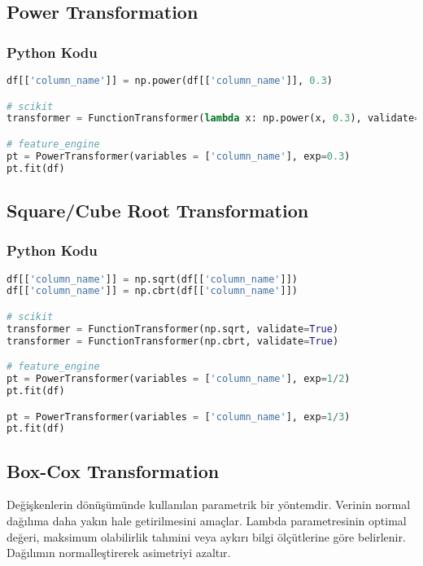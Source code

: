 \subsection{Power Transformation}

\subsubsection{Python Kodu}

\begin{lstlisting}[language=Python]
df[['column_name']] = np.power(df[['column_name']], 0.3)

# scikit
transformer = FunctionTransformer(lambda x: np.power(x, 0.3), validate=True)

# feature_engine
pt = PowerTransformer(variables = ['column_name'], exp=0.3)
pt.fit(df)
\end{lstlisting}

\subsection{Square/Cube Root Transformation}

\subsubsection{Python Kodu}

\begin{lstlisting}[language=Python]
df[['column_name']] = np.sqrt(df[['column_name']])
df[['column_name']] = np.cbrt(df[['column_name']])

# scikit
transformer = FunctionTransformer(np.sqrt, validate=True)
transformer = FunctionTransformer(np.cbrt, validate=True)

# feature_engine
pt = PowerTransformer(variables = ['column_name'], exp=1/2)
pt.fit(df)

pt = PowerTransformer(variables = ['column_name'], exp=1/3)
pt.fit(df)
\end{lstlisting}

\subsection{Box-Cox Transformation}
Değişkenlerin dönüşümünde kullanılan parametrik bir yöntemdir. Verinin normal dağılıma daha yakın hale getirilmesini amaçlar. Lambda parametresinin optimal değeri, maksimum olabilirlik tahmini veya aykırı bilgi ölçütlerine göre belirlenir. Dağılımın normalleştirerek asimetriyi azaltır.

